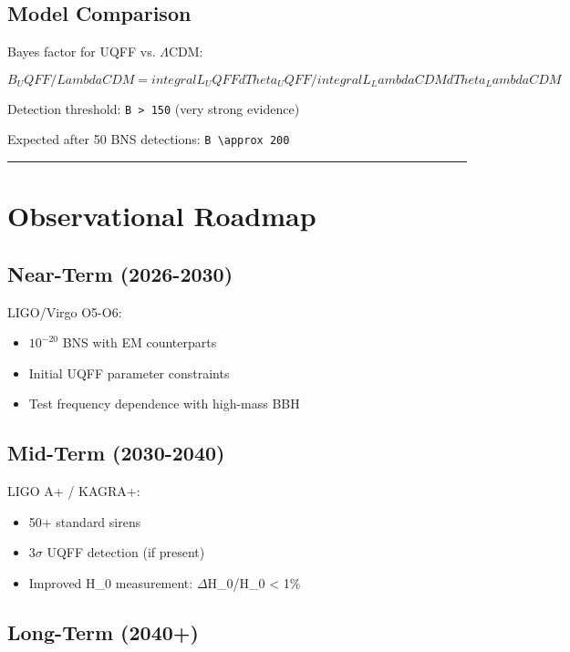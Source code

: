 \documentclass[12pt,a4paper]{article}
\begin{document}
\subsection{Model Comparison}

Bayes factor for UQFF vs. $\Lambda$CDM:

\begin{equation}
B_UQFF/LambdaCDM = integral L_UQFF dTheta_UQFF / integral L_LambdaCDM dTheta_LambdaCDM
\end{equation}

Detection threshold: \texttt{B > 150} (very strong evidence)

Expected after 50 BNS detections: \texttt{B \textbackslash approx 200}

\medskip\hrule\medskip

\section{Observational Roadmap}

\subsection{Near-Term (2026-2030)}

LIGO/Virgo O5-O6:

\begin{itemize}
  \item $10^{-20}$ BNS with EM counterparts
  \item Initial UQFF parameter constraints
  \item Test frequency dependence with high-mass BBH
\end{itemize}

\subsection{Mid-Term (2030-2040)}

LIGO A+ / KAGRA+:

\begin{itemize}
  \item 50+ standard sirens
  \item 3$\sigma$ UQFF detection (if present)
  \item Improved H\_0 measurement: $\Delta$H\_0/H\_0 < 1\%
\end{itemize}

\subsection{Long-Term (2040+)}
\end{document}
